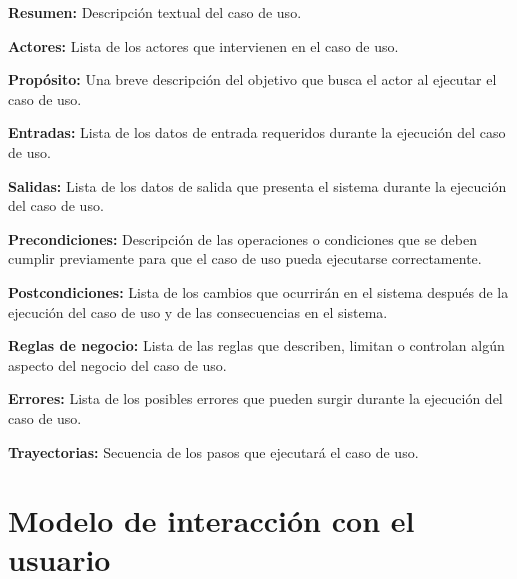 \documentclass[10pt]{book}
\begin{document}
\begin{objetivos}
	\item {\bf Resumen:} Descripción textual del caso de uso.
	\item {\bf Actores:} Lista de los actores que intervienen en el caso de uso.
	\item {\bf Propósito:} Una breve descripción del objetivo que busca el actor al ejecutar el caso de uso.
	\item {\bf Entradas:} Lista de los datos de entrada requeridos durante la ejecución del caso de uso.
	\item {\bf Salidas:} Lista de los datos de salida que presenta el sistema durante la ejecución del caso de uso.
	\item {\bf Precondiciones:} Descripción de las operaciones o condiciones que se deben cumplir previamente para que el caso de uso pueda ejecutarse correctamente.
	\item {\bf Postcondiciones:} Lista de los cambios que ocurrirán en el sistema después de la ejecución del caso de uso y de las consecuencias en el sistema.
	\item {\bf Reglas de negocio:} Lista de las reglas que describen, limitan o controlan algún aspecto del negocio del caso de uso.
	\item {\bf Errores:} Lista de los posibles errores que pueden surgir durante la ejecución del caso de uso.
	\item {\bf Trayectorias:} Secuencia de los pasos que ejecutará el caso de uso.
\end{objetivos}     

	
	


    	
\chapter{Modelo de interacción con el usuario}\label{chp:modeloInteraccionUsuario}
\end{document}
